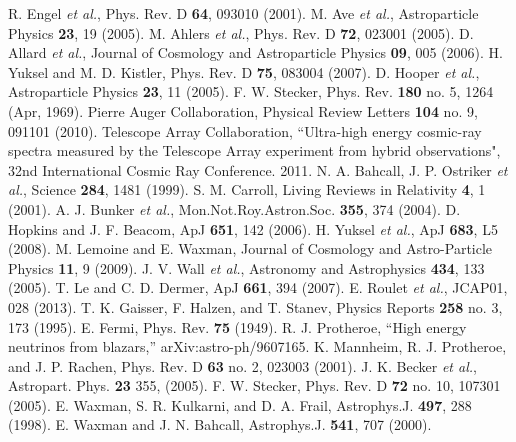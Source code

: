\begin{thebibliography}{1}
 R. Engel {\it et al.}, Phys. Rev. D \textbf{64}, 093010 (2001).
 M. Ave {\it et al.}, Astroparticle Physics \textbf{23}, 19 (2005).
 M. Ahlers {\it et al.}, Phys. Rev. D \textbf{72},  023001 (2005).
  D. Allard {\it et al.}, Journal of Cosmology and Astroparticle Physics \textbf{09},  005 (2006).
H. Yuksel and M. D. Kistler, Phys. Rev. D \textbf{75}, 083004 (2007).
 D. Hooper {\it et al.}, Astroparticle Physics \textbf{23}, 11 (2005).
 F. W. Stecker, Phys. Rev. \textbf{180} no. 5, 1264 (Apr, 1969).
 Pierre Auger Collaboration, Physical Review Letters \textbf{104} no. 9, 091101 (2010).
 Telescope Array Collaboration, 
``Ultra-high energy cosmic-ray spectra measured by the Telescope Array experiment from hybrid observations", 32nd International Cosmic Ray Conference. 2011.
 N. A. Bahcall, J. P. Ostriker {\it et al.}, Science \textbf{284}, 1481 (1999).
 S. M. Carroll, Living Reviews in Relativity \textbf{4}, 1 (2001).
 A. J. Bunker {\it et al.}, Mon.Not.Roy.Astron.Soc. \textbf{355}, 374 (2004).
 D. Hopkins and J. F. Beacom, ApJ \textbf{651}, 142 (2006). \newline H. Yuksel {\it et al.}, ApJ \textbf{683}, L5 (2008).
 M. Lemoine and E. Waxman, Journal of Cosmology and Astro-Particle Physics \textbf{11}, 9 (2009).
 J. V. Wall {\it et al.}, Astronomy and Astrophysics \textbf{434}, 133 (2005).
 T. Le and C. D. Dermer, ApJ \textbf{661}, 394 (2007).
 E. Roulet {\it et al.}, JCAP01, 028 (2013).
  T. K. Gaisser, F. Halzen, and T. Stanev, Physics Reports \textbf{258} no. 3, 173 (1995).
 E. Fermi, Phys. Rev. \textbf{75} (1949).
 R. J. Protheroe, “High energy neutrinos from blazars,” arXiv:astro-ph/9607165.
  K. Mannheim, R. J. Protheroe, and J. P. Rachen,  Phys. Rev. D \textbf{63} no. 2, 023003 (2001).
  J. K. Becker {\it et al.}, Astropart. Phys. \textbf{23} 355, (2005).
 F. W. Stecker, Phys. Rev. D \textbf{72} no. 10,  107301 (2005).
 E. Waxman, S. R. Kulkarni, and D. A. Frail,  Astrophys.J. \textbf{497}, 288 (1998).
 E. Waxman and J. N. Bahcall, Astrophys.J. \textbf{541}, 707 (2000).

\end{thebibliography}

